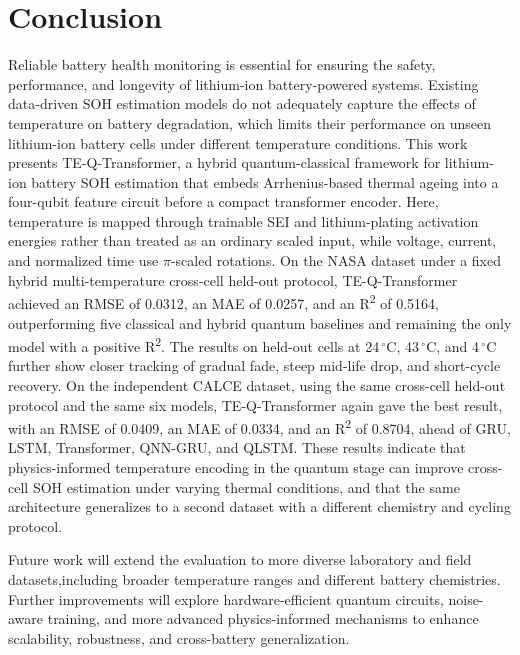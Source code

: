 \documentclass[a4paper,fleqn]{cas-sc}
\begin{document}
\section{Conclusion}
\label{sec:conclusion}
Reliable battery health monitoring is essential for ensuring the safety, performance, and longevity of lithium-ion battery-powered systems. Existing data-driven SOH estimation models do not adequately capture the effects of temperature on battery degradation, which limits their performance on unseen lithium-ion battery cells under different temperature conditions.
This work presents TE-Q-Transformer, a hybrid quantum-classical framework for lithium-ion battery SOH estimation that embeds Arrhenius-based thermal ageing into a four-qubit feature circuit before a compact transformer encoder. Here, temperature is mapped through trainable SEI and lithium-plating activation energies rather than treated as an ordinary scaled input, while voltage, current, and normalized time use $\pi$-scaled rotations. On the NASA dataset under a fixed hybrid multi-temperature cross-cell held-out protocol, TE-Q-Transformer achieved an RMSE of 0.0312, an MAE of 0.0257, and an R\textsuperscript{2} of 0.5164, outperforming five classical and hybrid quantum baselines and remaining the only model with a positive R\textsuperscript{2}. 
The results on held-out cells at 24\,$^\circ$C, 43\,$^\circ$C, and 4\,$^\circ$C further show closer tracking of gradual fade, steep mid-life drop, and short-cycle recovery. 
On the independent CALCE dataset, using the same cross-cell held-out protocol and the same six models, TE-Q-Transformer again gave the best result, with an RMSE of 0.0409, an MAE of 0.0334, and an R\textsuperscript{2} of 0.8704, ahead of GRU, LSTM, Transformer, QNN-GRU, and QLSTM.
These results indicate that physics-informed temperature encoding in the quantum stage can improve cross-cell SOH estimation under varying thermal conditions, and that the same architecture generalizes to a second dataset with a different chemistry and cycling protocol. 

Future work will extend the evaluation to more diverse laboratory and field datasets,including broader temperature ranges and different battery chemistries. Further improvements will explore hardware-efficient quantum circuits, noise-aware training, and more advanced physics-informed mechanisms to enhance scalability, robustness, and cross-battery generalization.


\printcredits
\end{document}
